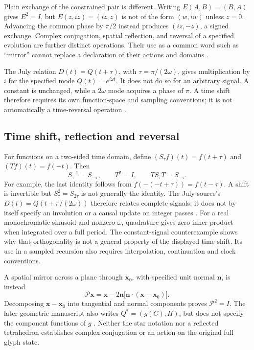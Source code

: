 \documentclass[11pt,a4paper]{article}
\theoremstyle{definition}
\numberwithin{equation}{section}
\begin{document}
Plain exchange of the constrained pair is different. Writing
$E(A,B)=(B,A)$ gives $E^2=I$, but
$E(z,iz)=(iz,z)$ is not of the form $(w,iw)$ unless $z=0$.
Advancing the common phase by $\pi/2$ instead produces $(iz,-z)$, a signed
exchange. Complex conjugation, spatial reflection, and reversal of a
specified evolution are further distinct operations. Their use as a common
word such as ``mirror'' cannot replace a declaration of their actions and
domains \cite[\S6.1]{F01} \cite[\S6]{Branch}.

The July relation $D(t)=Q(t+\tau)$, with $\tau=\pi/(2\omega)$, gives
multiplication by $i$ for the specified mode $Q(t)=e^{i\omega t}$. It does
not do so for an arbitrary signal. A constant is unchanged, while a
$2\omega$ mode acquires a phase of $\pi$. A time shift therefore requires
its own function-space and sampling conventions; it is not automatically a
time-reversal operation \cite[physical pp.~3,8]{P06} \cite[\S6.3]{F01}.

\subsection{Time shift, reflection and reversal}
\label{sec:shift-reversal}

For functions on a two-sided time domain, define
$(S_\tau f)(t)=f(t+\tau)$ and $(Tf)(t)=f(-t)$.
Then
\begin{equation}
 S_\tau^{-1}=S_{-\tau},\qquad T^2=I,\qquad
 TS_\tau T=S_{-\tau}.
 \label{eq:shift-reversal}
\end{equation}
For example, the last identity follows from
$f(-(-t+\tau))=f(t-\tau)$. A shift is invertible but
$S_\tau^2=S_{2\tau}$ is not generally the identity. The July source's
$D(t)=Q(t+\pi/(2\omega))$ therefore relates complete signals; it does not
by itself specify an involution or a causal update on integer passes
\cite[physical pp.~3,8, Eq.~(1) and equation-index entry (1)]{P06}.
For a real monochromatic sinusoid and nonzero $\omega$, quadrature gives
zero inner product when integrated over a full period. The constant-signal
counterexample shows why that orthogonality is not a general property of
the displayed time shift. Its use in a sampled recursion also requires
interpolation, continuation and clock conventions.

A spatial mirror across a plane through $\mathbf x_0$, with specified
unit normal $\mathbf n$, is instead
\begin{equation}
 \mathcal P\mathbf x=
 \mathbf x-2\mathbf n\bigl[\mathbf n\cdot(\mathbf x-\mathbf x_0)\bigr].
 \label{eq:reflection}
\end{equation}
Decomposing $\mathbf x-\mathbf x_0$ into tangential and normal components
proves $\mathcal P^2=I$. The later geometric manuscript also writes
$Q^*=(g(C),H)$, but does not specify the component functions of $g$
\cite[physical p.~10, \S4.2]{P14}.
Neither the star notation nor a reflected tetrahedron establishes
complex conjugation or an action on the original full glyph state.
\end{document}
